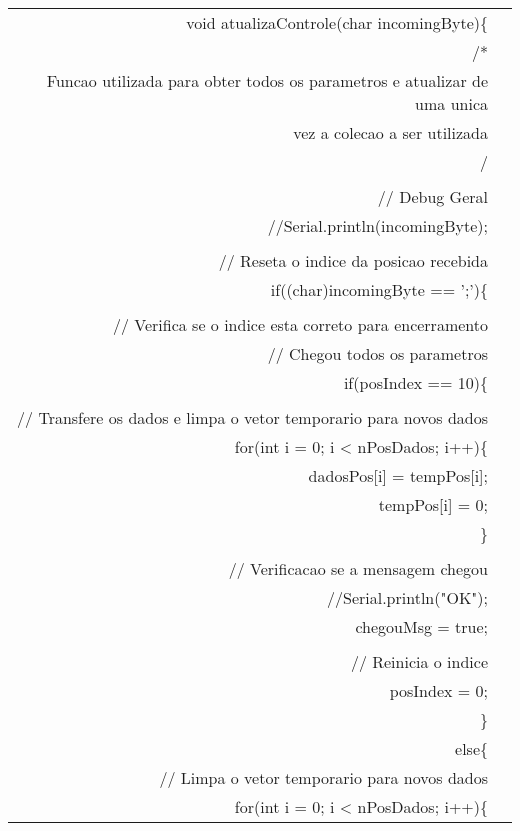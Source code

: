 \begin{longtable}{Rp{15cm}}
void atualizaControle(char incomingByte)\{ \\
\qquad  /* \\
\qquad   * Funcao utilizada para obter todos os parametros e atualizar de uma unica \\
\qquad   * vez a colecao a ser utilizada \\
\qquad   */ \\
   \\
\qquad // Debug Geral \\
\qquad //Serial.println(incomingByte); \\
\\
\qquad    // Reseta o indice da posicao recebida \\
\qquad    if((char)incomingByte == ';')\{ \\
\\
\qquad \qquad      // Verifica se o indice esta correto para encerramento \\
\qquad \qquad      // Chegou todos os parametros \\
\qquad \qquad      if(posIndex == 10)\{ \\
        \\
\qquad \qquad \qquad       // Transfere os dados e limpa o vetor temporario para novos dados \\
\qquad \qquad \qquad        for(int i = 0; i < nPosDados; i++)\{ \\
\qquad \qquad \qquad \qquad          dadosPos[i] = tempPos[i]; \\
\qquad \qquad \qquad \qquad          tempPos[i] = 0; \\
\qquad \qquad \qquad        \} \\ 
\\
\qquad \qquad \qquad        // Verificacao se a mensagem chegou \\
\qquad \qquad \qquad        //Serial.println("OK"); \\
\qquad \qquad \qquad        chegouMsg = true; \\                   
\\
\qquad \qquad \qquad        // Reinicia o indice \\
\qquad \qquad \qquad        posIndex = 0; \\
\qquad \qquad       \} \\
\qquad \qquad      else\{ \\
\qquad \qquad \qquad        // Limpa o vetor temporario para novos dados \\
\qquad \qquad \qquad        for(int i = 0; i < nPosDados; i++)\{ \\

\end{longtable}

